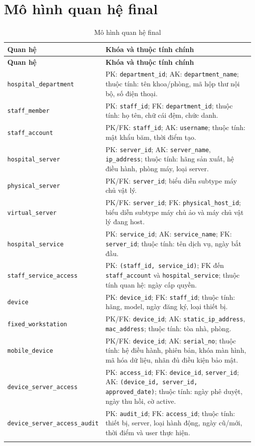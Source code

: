 \documentclass[12pt, a4paper, oneside, openany]{report}
\newcommand{\dbid}[1]{{\normalfont\ttfamily\footnotesize\nolinkurl{#1}}}
\newcommand{\tabdbid}[1]{{\normalfont\ttfamily\scriptsize\nolinkurl{#1}}}
\begin{document}
\section{Mô hình quan hệ final}

\begin{longtable}{|L{4.8cm}|L{8.8cm}|}
\hline
\normalfont\normalsize\textbf{Quan hệ} & \textbf{Khóa và thuộc tính chính} \\
\hline
\endfirsthead
\hline
\normalfont\normalsize\textbf{Quan hệ} & \textbf{Khóa và thuộc tính chính} \\
\hline
\endhead
\tabdbid{hospital_department} & PK: \dbid{department_id}; AK: \dbid{department_name}; thuộc tính: tên khoa/phòng, mã hộp thư nội bộ, số điện thoại. \\
\hline
\tabdbid{staff_member} & PK: \dbid{staff_id}; FK: \dbid{department_id}; thuộc tính: họ tên, chữ cái đệm, chức danh. \\
\hline
\tabdbid{staff_account} & PK/FK: \dbid{staff_id}; AK: \dbid{username}; thuộc tính: mật khẩu băm, thời điểm tạo. \\
\hline
\tabdbid{hospital_server} & PK: \dbid{server_id}; AK: \dbid{server_name}, \dbid{ip_address}; thuộc tính: hãng sản xuất, hệ điều hành, phòng máy, loại server. \\
\hline
\tabdbid{physical_server} & PK/FK: \dbid{server_id}; biểu diễn subtype máy chủ vật lý. \\
\hline
\tabdbid{virtual_server} & PK/FK: \dbid{server_id}; FK: \dbid{physical_host_id}; biểu diễn subtype máy chủ ảo và máy chủ vật lý đang host. \\
\hline
\tabdbid{hospital_service} & PK: \dbid{service_id}; AK: \dbid{service_name}; FK: \dbid{server_id}; thuộc tính: tên dịch vụ, ngày bắt đầu. \\
\hline
\tabdbid{staff_service_access} & PK: \dbid{(staff_id, service_id)}; FK đến \dbid{staff_account} và \dbid{hospital_service}; thuộc tính quan hệ: ngày cấp quyền. \\
\hline
\tabdbid{device} & PK: \dbid{device_id}; FK: \dbid{staff_id}; thuộc tính: hãng, model, ngày đăng ký, loại thiết bị. \\
\hline
\tabdbid{fixed_workstation} & PK/FK: \dbid{device_id}; AK: \dbid{static_ip_address}, \dbid{mac_address}; thuộc tính: tòa nhà, phòng. \\
\hline
\tabdbid{mobile_device} & PK/FK: \dbid{device_id}; AK: \dbid{serial_no}; thuộc tính: hệ điều hành, phiên bản, khóa màn hình, mã hóa dữ liệu, nhãn đủ điều kiện bảo mật. \\
\hline
\tabdbid{device_server_access} & PK: \dbid{access_id}; FK: \dbid{device_id}, \dbid{server_id}; AK: \dbid{(device_id, server_id, approved_date)}; thuộc tính: ngày phê duyệt, ngày thu hồi, cờ active. \\
\hline
\tabdbid{device_server_access_audit} & PK: \dbid{audit_id}; FK: \dbid{access_id}; thuộc tính: thiết bị, server, loại hành động, ngày cũ/mới, thời điểm và user thực hiện. \\
\hline
\caption{Mô hình quan hệ final}
\end{longtable}
\clearpage
\end{document}

